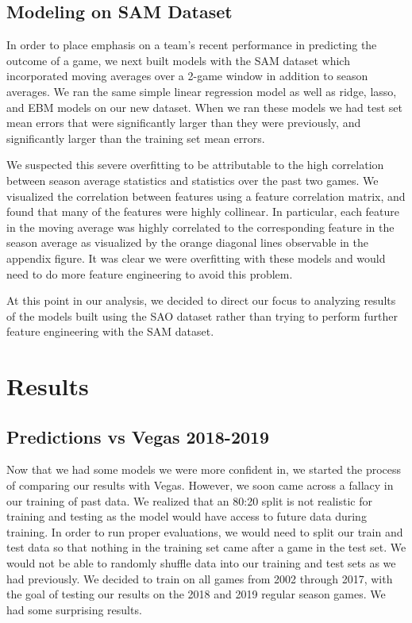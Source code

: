 \documentclass{article}
\begin{document}
\begin{multicols}{2}
\subsection{Modeling on SAM Dataset}
In order to place emphasis on a team’s recent performance in predicting the outcome of a game, we next built models with the SAM dataset which incorporated moving averages over a 2-game window in addition to season averages. We ran the same simple linear regression model as well as ridge, lasso, and EBM models on our new dataset. When we ran these models we had test set mean errors that were significantly larger than they were previously, and significantly larger than the training set mean errors.

We suspected this severe overfitting to be attributable to the high correlation between season average statistics and statistics over the past two games. We visualized the correlation between features using a feature correlation matrix, and found that many of the features were highly collinear. In particular, each feature in the moving average was highly correlated to the corresponding feature in the season average as visualized by the orange diagonal lines observable in the appendix figure. It was clear we were overfitting with these models and would need to do more feature engineering to avoid this problem. 

At this point in our analysis, we decided to direct our focus to analyzing results of the models built using the SAO dataset rather than trying to perform further feature engineering with the SAM dataset.
\section{Results}
\subsection{Predictions vs Vegas 2018-2019}
Now that we had some models we were more confident in, we started the process of comparing our results with Vegas. However, we soon came across a fallacy in our training of past data. We realized that an 80:20 split is not realistic for training and testing as the model would have access to future data during training. In order to run proper evaluations, we would need to split our train and test data so that nothing in the training set came after a game in the test set. We would not be able to randomly shuffle data into our training and test sets as we had previously. We decided to train on all games from 2002 through 2017, with the goal of testing our results on the 2018 and 2019 regular season games. We had some surprising results.


\end{multicols}
\end{document}
